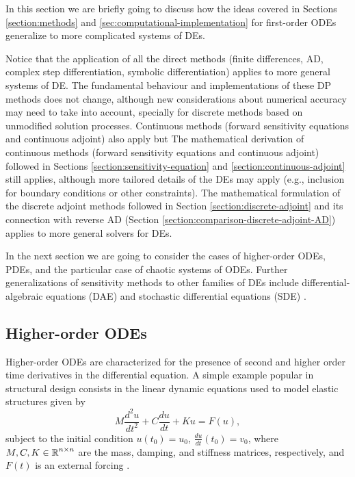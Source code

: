 In this section we are briefly going to discuss how the ideas covered in Sections \ref{section:methods} and \ref{sec:computational-implementation} for first-order ODEs generalize to more complicated systems of DEs. 

Notice that the application of all the direct methods (finite differences, AD, complex step differentiation, symbolic differentiation) applies to more general systems of DE.
The fundamental behaviour and implementations of these DP methods does not change, although new considerations about numerical accuracy may need to take into account, specially for discrete methods based on unmodified solution processes. 
Continuous methods (forward sensitivity equations and continuous adjoint) also apply but 
The mathematical derivation of continuous methods (forward sensitivity equations and continuous adjoint) followed in Sections \ref{section:sensitivity-equation} and \ref{section:continuous-adjoint} still applies, although more tailored details of the DEs may apply (e.g., inclusion for boundary conditions or other constraints). 
The mathematical formulation of the discrete adjoint methods followed in Section \ref{section:discrete-adjoint} and its connection with reverse AD (Section \ref{section:comparison-discrete-adjoint-AD}) applies to more general solvers for DEs. 

In the next section we are going to consider the cases of higher-order ODEs, PDEs, and the particular case of chaotic systems of ODEs. 
Further generalizations of sensitivity methods to other families of DEs include differential-algebraic equations (DAE) \cite{Cao_Li_Petzold_2002} and stochastic differential equations (SDE) \cite{li2020scalable}. 


\subsection{Higher-order ODEs}

Higher-order ODEs are characterized for the presence of second and higher order time derivatives in the differential equation. 
A simple example popular in structural design consists in the linear dynamic equations used to model elastic structures given by 
\begin{equation}
    M \frac{d^2 u}{dt^2}
    +
    C \frac{du}{dt}
    + 
    K u
    = 
    F(u),
\end{equation}
subject to the initial condition $u(t_0) = u_0$, $\frac{du}{dt}(t_0) = v_0$, where $M, C, K \in \operatorname{\mathbb{R}}^{n \times n}$ are the mass, damping, and stiffness matrices, respectively, and $F(t)$ is an external forcing \cite{min1999optimal, Jensen_Nakshatrala_Tortorelli_2014}.  

